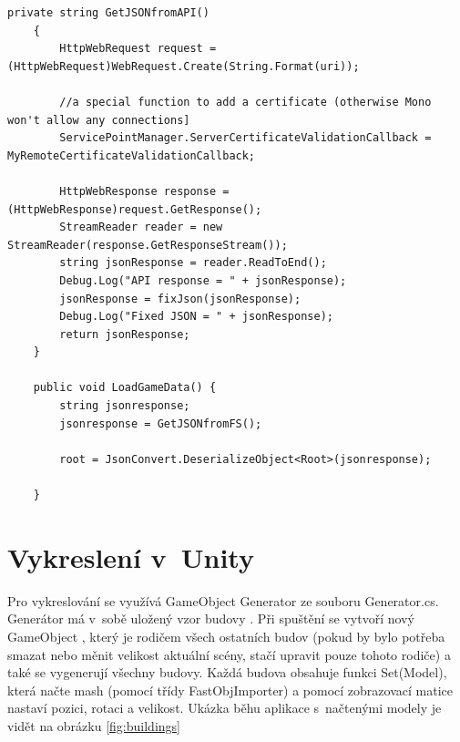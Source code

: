 \documentclass[thesis=B,czech]{FITthesis}[2012/06/26]
\begin{document}
	\begin{minipage}[c]{0.95\textwidth}
	\begin{lstlisting}[frame=single]
	 private string GetJSONfromAPI()
    {
        HttpWebRequest request = (HttpWebRequest)WebRequest.Create(String.Format(uri));

        //a special function to add a certificate (otherwise Mono won't allow any connections]
        ServicePointManager.ServerCertificateValidationCallback = MyRemoteCertificateValidationCallback;

        HttpWebResponse response = (HttpWebResponse)request.GetResponse();
        StreamReader reader = new StreamReader(response.GetResponseStream());
        string jsonResponse = reader.ReadToEnd();
        Debug.Log("API response = " + jsonResponse);
        jsonResponse = fixJson(jsonResponse);
        Debug.Log("Fixed JSON = " + jsonResponse);
        return jsonResponse;
    }

    public void LoadGameData() {
        string jsonresponse;
        jsonresponse = GetJSONfromFS();

        root = JsonConvert.DeserializeObject<Root>(jsonresponse);       

    }
	\end{lstlisting}
	\end{minipage}
	
	
	\section{Vykreslení v~Unity}
    Pro vykreslování se využívá GameObject Generator ze souboru Generator.cs. Generátor má v~sobě uložený vzor budovy . Při spuštění se vytvoří nový GameObject , který je rodičem všech ostatních budov (pokud by bylo potřeba smazat nebo měnit velikost aktuální scény, stačí upravit pouze tohoto rodiče) a také se vygenerují všechny budovy. Každá budova obsahuje funkci Set(Model), která načte mash (pomocí třídy FastObjImporter) a pomocí zobrazovací matice nastaví pozici, rotaci a velikost. Ukázka běhu aplikace s~načtenými modely je vidět na obrázku \ref{fig:buildings}
    
    
\end{document}
